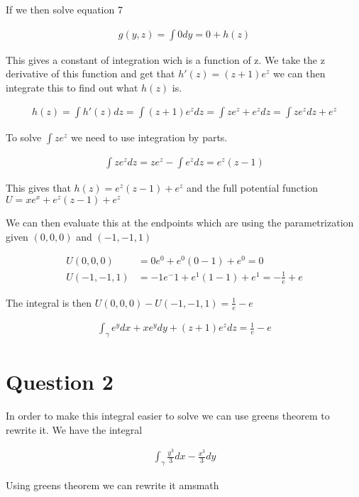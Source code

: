 \documentclass[a4paper]{article}
\begin{document}
If we then solve equation 7

\begin{align}
    g(y,z) = \int 0 dy = 0 + h(z)
\end{align}

This gives a constant of integration wich is a function of z. We take the z derivative of this function and get that $h'(z) = (z+1)e^z$ we can then integrate this to find out what $h(z)$ is.

\begin{align}
    h(z) = \int h'(z) dz = \int (z+1)e^z dz = \int ze^z + e^z dz= \int ze^z dz +  e^z
\end{align}

To solve $\int ze^z$ we need to use integration by parts. 

\begin{align}
    \int ze^z dz = ze^z - \int e^z dz = e^z(z - 1)
\end{align}

This gives that $h(z) = e^z(z-1) + e^z$ and the full potential function $U = xe^x + e^z(z-1) + e^z$

We can then evaluate this at the endpoints which are using the parametrization given $(0,0,0)$ and $(-1,-1,1)$

\begin{align}
    U(0,0,0) &= 0e^0 + e^0(0-1) + e^0 = 0\\
    U(-1,-1,1) &= -1e^-1 + e^1(1-1) + e^1 = -\frac{1}{e} + e
\end{align}

The integral is then $U(0,0,0) - U(-1,-1,1) = \frac{1}{e} - e$ 

\begin{align}
    \int_{\gamma} e^y dx + xe^y dy + (z+1)e^z dz = \frac{1}{e} - e 
\end{align}

\section*{Question 2}
\setcounter{equation}{0}

In order to make this integral easier to solve we can use greens theorem to rewrite it. We have the integral

\begin{align}
    \int_{\gamma} \frac{y^3}{3}dx  - \frac{x^3}{3}dy
\end{align}

Using greens theorem we can rewrite it amsmath
\end{document}
